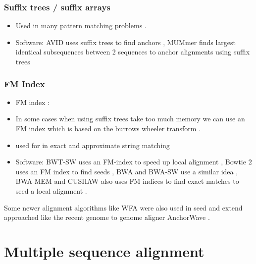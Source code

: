 \documentclass[
  11pt,
  twoside]{scrbook}
\begin{document}
\hypertarget{suffix-trees-suffix-arrays}{%
\subsubsection{Suffix trees / suffix arrays}\label{suffix-trees-suffix-arrays}}

\begin{itemize}
\item
  Used in many pattern matching problems \autocite{gusfieldAlgorithmsStringsTrees1997}.
\item
  Software: AVID uses suffix trees to find anchors \autocite{brayAVIDGlobalAlignment2003}, MUMmer finds largest identical subsequences between 2 sequences to anchor alignments using suffix trees \autocite{delcherFastAlgorithmsLargescale2002}
\end{itemize}

\hypertarget{fm-index}{%
\subsubsection{FM Index}\label{fm-index}}

\begin{itemize}
\item
  FM index \autocite{ferraginaOpportunisticDataStructures2000}:
\item
  In some cases when using suffix trees take too much memory we can use an FM index which is based on the burrows wheeler transform \autocite{burrowsBlockSortingLosslessData1994}.
\item
  used for in exact and approximate string matching \autocite{sungAlgorithmsBioinformaticsPractical2011}
\item
  Software: BWT-SW uses an FM-index to speed up local alignment \autocite{lamCompressedIndexingLocal2008}, Bowtie 2 uses an FM index to find seeds \autocite{langmeadFastGappedreadAlignment2012}, BWA and BWA-SW use a similar idea \autocite{liFastAccurateShort2009,liFastAccurateLongread2010}, BWA-MEM \autocite{liAligningSequenceReads2013} and CUSHAW \autocite{liuLongReadAlignment2012} also uses FM indices to find exact matches to seed a local alignment .
\end{itemize}

Some newer alignment algorithms like WFA were also used in seed and extend approached like the recent genome to genome aligner AnchorWave \autocite{songAnchorWaveSensitiveAlignment2022}.

\hypertarget{multiple-sequence-alignment}{%
\section{Multiple sequence alignment}\label{multiple-sequence-alignment}}
\end{document}
